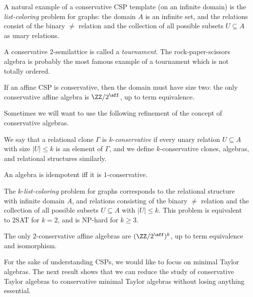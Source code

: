\begin{ex} A natural example of a conservative CSP template (on an infinite domain) is the \emph{list-coloring} problem for graphs: the domain $A$ is an infinite set, and the relations consist of the binary $\ne$ relation and the collection of all possible subsets $U \subseteq A$ as unary relations.
\end{ex}

\begin{ex} A conservative $2$-semilattice is called a \emph{tournament}. The rock-paper-scissors algebra is probably the most famous example of a tournament which is not totally ordered.%
\end{ex}

\begin{ex} If an affine CSP is conservative, then the domain must have size two: the only conservative affine algebra is $\ZZ/2^{\aff}$, up to term equivalence.
\end{ex}

Sometimes we will want to use the following refinement of the concept of conservative algebras.

\begin{defn} We say that a relational clone $\Gamma$ is $k$-\emph{conservative} if every unary relation $U \subseteq A$ with size $|U| \le k$ is an element of $\Gamma$, and we define $k$-conservative clones, algebras, and relational structures similarly.
\end{defn}

\begin{ex} An algebra is idempotent iff it is $1$-conservative.
\end{ex}

\begin{ex} The $k$-\emph{list-coloring} problem for graphs corresponds to the relational structure with infinite domain $A$, and relations consisting of the binary $\ne$ relation and the collection of all possible subsets $U \subseteq A$ with $|U| \le k$. This problem is equivalent to 2SAT for $k = 2$, and is NP-hard for $k \ge 3$.
\end{ex}

\begin{ex} The only $2$-conservative affine algebras are $(\ZZ/2^{\aff})^k$, up to term equivalence and isomorphism.
\end{ex}

For the sake of understanding CSPs, we would like to focus on minimal Taylor algebras. The next result shows that we can reduce the study of conservative Taylor algebras to conservative minimal Taylor algebras without losing anything essential.

